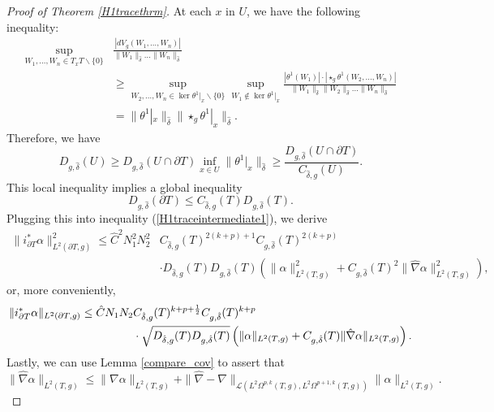 \documentclass[10pt,a4paper]{amsart}
\begin{document}
\begin{proof}[Proof of Theorem \ref{H1tracethrm}]
At each $x$ in $U$, we have the following inequality:
\begin{align*}
\sup_{W_1,\dots,W_n \in T_xT\backslash\{0\}}&\frac{|dV_{g}(W_1,\dots,W_n)|}{\|W_1\|_{\hat \delta}\dots\|W_n\|_{\hat \delta}} \\&\ge \sup_{W_2,\dots,W_n \in \ker \theta^1|_x\backslash\{0\}}\sup_{W_1 \notin \ker \theta^1|_x}\frac{|\theta^1(W_1)| \cdot |\star_g\theta^1(W_2,\dots,W_n)|}{\|W_1\|_{\hat \delta}\|W_2\|_{\hat \delta} \dots\|W_n\|_{\hat \delta}}\\
&= \|\theta^1|_x\|_{\hat \delta}\|\star_g\theta^1|_x\|_{\hat \delta}.
\end{align*}
Therefore, we have
\[
D_{g,\hat \delta}(U) \ge D_{g,\hat \delta}(U \cap \partial T)\inf_{x \in U}\|\theta^1|_x\|_{\hat \delta}  \ge \frac{D_{g,\hat \delta}(U \cap \partial T)}{C_{\hat \delta,g}(U)}. 
\]
This local inequality implies a global inequality
\[
D_{g,\hat \delta}(\partial T) \le C_{\hat \delta,g}(T)D_{g,\hat \delta}(T).
\]
Plugging this into inequality (\ref{H1traceintermediate1}), we derive
\begin{align*}
\|i_{\partial T}^*\alpha\|_{L^2(\partial T,g)}^2 \le \hat C^2 N_1^2N_2^2 &C_{\hat \delta,g}(T)^{2(k+p) + 1}C_{g,\hat \delta}(T)^{2(k+p)} \\&\cdot D_{\hat \delta,g}(T)D_{g,\hat \delta}(T)\left(\|\alpha\|_{L^2(T,g)}^2 + C_{g,\hat \delta}(T)^2\|\hat\nabla\alpha\|_{L^2(T,g)}^2\right),
\end{align*}
or, more conveniently,
\begin{align}
\|i_{\partial T}^*\alpha\|_{L^2(\partial T,g)} \le \hat C N_1N_2 & C_{\hat \delta,g}(T)^{k+p + \frac{1}{2}}C_{g,\hat \delta}(T)^{k+p} \notag \\
&\cdot \sqrt{D_{\hat \delta,g}(T)D_{g,\hat \delta}(T)}\left(\|\alpha\|_{L^2(T,g)} + C_{g,\hat \delta}(T)\|\hat\nabla\alpha\|_{L^2(T,g)}\right).\label{tracebounds}
\end{align}
Lastly, we can use Lemma \ref{compare_cov} to assert that 
\[
\|\hat\nabla \alpha\|_{L^2(T,g)} \le \|\nabla\alpha\|_{L^2(T,g)} + \|\hat\nabla - \nabla\|_{\mathcal{L}(L^2\Omega^{p,k}(T,g),L^2\Omega^{p+1,k}(T,g))}\|\alpha\|_{L^2(T,g)}
.\]


\end{proof}
\end{document}
